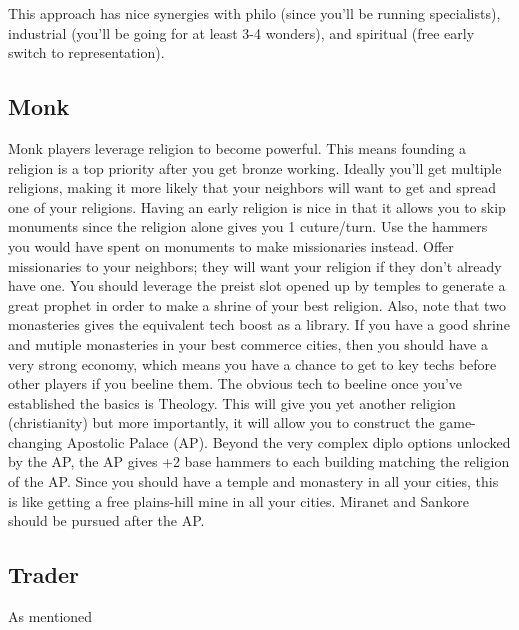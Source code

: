 \documentclass[10pt]{article}
\begin{document}
This approach has nice synergies with philo (since you'll be running specialists), industrial (you'll be
going for at least 3-4 wonders), and spiritual (free early switch to representation).

\subsection*{Monk}

Monk players leverage religion to become powerful. This means founding a religion is a top priority
after you get bronze working. Ideally you'll get multiple religions, making it more likely that your
neighbors will want to get and spread one of your religions. Having an early religion is nice in that
it allows you to skip monuments since the religion alone gives you 1 cuture/turn. Use the hammers you would
have spent on monuments to make missionaries instead. Offer missionaries to your neighbors; they will want
your religion if they don't already have one. You should leverage the preist slot opened up by temples
to generate a great prophet in order to make a shrine of your best religion. Also, note that two monasteries
gives the equivalent tech boost as a library. If you have a good shrine and mutiple monasteries in your
best commerce cities, then you should have a very strong economy, which means you have a chance to get
to key techs before other players if you beeline them. The obvious tech to beeline once you've established
the basics is Theology. This will give you yet another religion (christianity) but more importantly, it will
allow you to construct the game-changing Apostolic Palace (AP). Beyond the very complex diplo options unlocked
by the AP, the AP gives +2 base hammers to each building matching the religion of the AP. Since you should have
a temple and monastery in all your cities, this is like getting a free plains-hill mine in all your cities.
Miranet and Sankore should be pursued after the AP.

\subsection*{Trader}

As mentioned 
\end{document}
